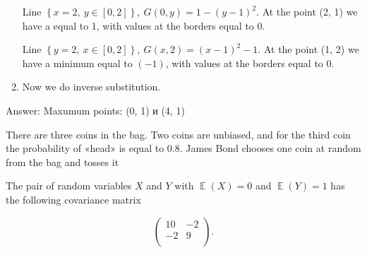 \documentclass[addpoints, answers]{exam} %
\DeclareMathOperator{\E}{\mathbb{E}}
\let\P\relax
\DeclareMathOperator{\P}{\mathbb{P}}
\begin{document}
\begin{questions}
\begin{solution}
\begin{enumerate}
Line $\left\{x=2,\ y\in \left[0,2\right]\right\},\ G\left(0,y\right)=1-{\left(y-1\right)}^2$. At the point (2, 1) we have a \textbf{} equal to 1, with values at the borders equal to $0$.

Line $\left\{y=2,\ x\in \left[0,2\right]\right\},\ G\left(x,2\right)={\left(x-1\right)}^2-1$. At the point (1, 2) we have a minimum equal to $(-1)$, with values at the borders equal to 0.

\item  Now we do inverse substitution.
\end{enumerate}

Answer: Maxumum points: (0, 1) и (4, 1)


\end{solution}

\newpage

\question
There are three coins in the bag. Two coins are unbiased, and for the third coin the probability of «head» is equal to $0.8$. James Bond chooses one coin at random from the bag and tosses it



\question
The pair of random variables $X$ and $Y$ with $\E(X)=0$ and $\E(Y)=1$ has the following covariance matrix


\[
\begin{pmatrix}
10 & -2 \\
-2 & 9 \\
\end{pmatrix}.
\]




\end{questions}
\end{document}
